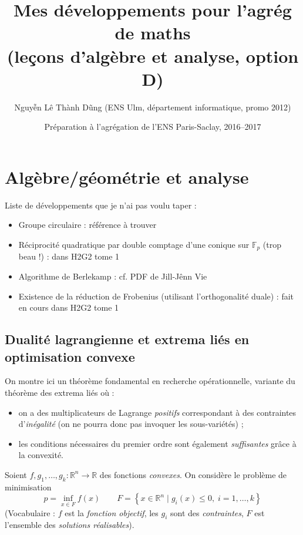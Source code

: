 \documentclass[a4paper, 11pt]{article}
\def\F{\mathbb{F}}
\def\R{\mathbb{R}}
\begin{document}
\title{Mes développements pour l'agrég de maths\\
  (leçons d'algèbre et analyse, option D)}
\author{Nguyễn Lê Thành Dũng (ENS Ulm, département informatique, promo 2012)}
\date{Préparation à l'agrégation de l'ENS Paris-Saclay, 2016--2017}
\maketitle

\tableofcontents

\newpage

\section{Algèbre/géométrie et analyse}

Liste de développements que je n'ai pas voulu taper :

\begin{itemize}
\item Groupe circulaire : référence à trouver 
\item Réciprocité quadratique par double comptage d'une conique sur $\F_p$ (trop
  beau !) : dans H2G2 tome 1
\item Algorithme de Berlekamp : cf. PDF de Jill-Jênn Vie
\item Existence de la réduction de Frobenius (utilisant l'orthogonalité duale) :
  fait en cours dans H2G2 tome 1
\end{itemize}

\newpage

\subsection{Dualité lagrangienne et extrema liés en optimisation convexe}

On montre ici un théorème fondamental en recherche opérationnelle, variante du
théorème des extrema liés où :
\begin{itemize}
\item on a des multiplicateurs de Lagrange \emph{positifs} correspondant à des
  contraintes d'\emph{inégalité} (on ne pourra donc pas invoquer les
  sous-variétés) ;
\item les conditions nécessaires du premier ordre sont également
  \emph{suffisantes} grâce à la convexité.
\end{itemize}
Soient $f,g_1,\ldots,g_k : \R^n \to \R$ des fonctions \emph{convexes}.
On considère le problème de minimisation
\[ p = \inf_{x \in F} f(x) \qquad F = \left\{ x \in \R^n \mid
  g_i(x) \leq 0,\; i = 1,\ldots,k \right\} \]
(Vocabulaire : $f$ est la \emph{fonction objectif}, les $g_i$ sont des
\emph{contraintes}, $F$ est l'ensemble des \emph{solutions réalisables}).
\end{document}
